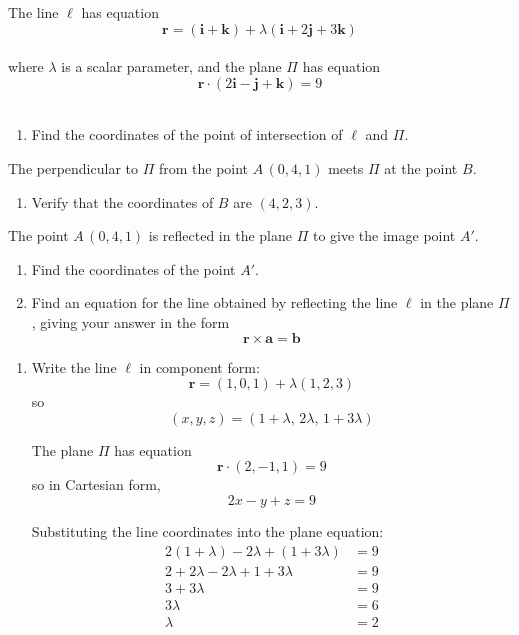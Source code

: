 \documentclass[leqno]{article}
\begin{document}
\begin{enumerate}[
  label=\textbf{\arabic*.},
  leftmargin=*,
  topsep=0pt,
  partopsep=0pt,
  parsep=0pt
]
The line $\ell$ has equation
\[
\mathbf{r}=(\mathbf{i}+\mathbf{k})+\lambda(\mathbf{i}+2\mathbf{j}+3\mathbf{k})
\] \\
where $\lambda$ is a scalar parameter, and the plane $\Pi$ has equation
\[
\mathbf{r}\cdot(2\mathbf{i}-\mathbf{j}+\mathbf{k})=9
\] \\
\begin{enumerate}[label=\textbf{(\alph*)}]
  \item Find the coordinates of the point of intersection of $\ell$ and $\Pi$.  \\
\end{enumerate}
The perpendicular to $\Pi$ from the point $A\,(0,4,1)$ meets $\Pi$ at the point $B$. \\
\begin{enumerate}[label=\textbf{(\alph*)}, resume]
  \item Verify that the coordinates of $B$ are $(4,2,3)$.  \\
\end{enumerate}
The point $A\,(0,4,1)$ is reflected in the plane $\Pi$ to give the image point $A'$. \\
\begin{enumerate}[label=\textbf{(\alph*)}, resume]
  \item Find the coordinates of the point $A'$.  \\
  \item Find an equation for the line obtained by reflecting the line $\ell$ in the plane $\Pi$, giving your answer in the form
  \[
  \mathbf{r}\times\mathbf{a}=\mathbf{b}
  \]
\end{enumerate}

\vspace*{30pt}

\begin{tcolorbox}[colback=white, colframe=scarlet, title={\textbf{Solution}}, breakable, grow to left by=6mm, grow to right by=10mm]
\begin{enumerate}[label=\textbf{(\alph*)}]
  \item Write the line \(\ell\) in component form:
  \[
  \mathbf r=(1,0,1)+\lambda(1,2,3)
  \]
  so
  \[
  (x,y,z)=(1+\lambda,\,2\lambda,\,1+3\lambda)
  \]

  The plane \(\Pi\) has equation
  \[
  \mathbf r\cdot(2,-1,1)=9
  \]
  so in Cartesian form,
  \[
  2x-y+z=9
  \]

  Substituting the line coordinates into the plane equation:
  \begin{align*}
  2(1+\lambda)-2\lambda+(1+3\lambda)&=9\\
  2+2\lambda-2\lambda+1+3\lambda&=9\\
  3+3\lambda&=9\\
  3\lambda&=6\\
  \lambda&=2
  \end{align*}


\end{enumerate}
\end{tcolorbox}
\end{enumerate}
\end{document}
